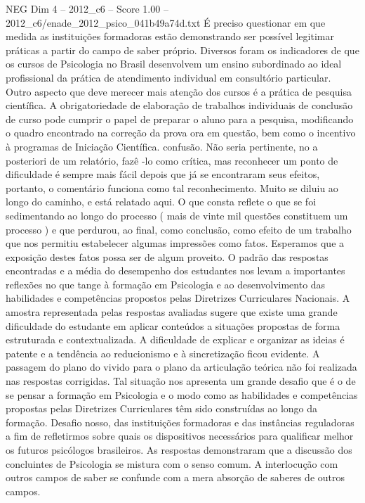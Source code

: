 \begin{textsample}{NEG Dim 4 – 2012\_c6 – Score 1.00 – 2012\_c6/enade\_2012\_psico\_041b49a74d.txt}
É preciso questionar em que medida as instituições formadoras estão demonstrando ser possível legitimar práticas a partir do campo de saber próprio.
Diversos foram os indicadores de que os cursos de Psicologia no Brasil desenvolvem um ensino subordinado ao ideal profissional da prática de atendimento individual em consultório particular.
Outro aspecto que deve merecer mais atenção dos cursos é a prática de pesquisa científica.
A obrigatoriedade de elaboração de trabalhos individuais de conclusão de curso pode cumprir o papel de preparar o aluno para a pesquisa, modificando o quadro encontrado na correção da prova ora em questão, bem como o incentivo à programas de Iniciação Científica. confusão.
Não seria pertinente, no a posteriori de um relatório, fazê -lo como crítica, mas reconhecer um ponto de dificuldade é sempre mais fácil depois que já se encontraram seus efeitos, portanto, o comentário funciona como tal reconhecimento.
Muito se diluiu ao longo do caminho, e está relatado aqui.
O que consta reflete o que se foi sedimentando ao longo do processo ( mais de vinte mil questões constituem um processo ) e que perdurou, ao final, como conclusão, como efeito de um trabalho que nos permitiu estabelecer algumas impressões como fatos.
Esperamos que a exposição destes fatos possa ser de algum proveito.
O padrão das respostas encontradas e a média do desempenho dos estudantes nos levam a importantes reflexões no que tange à formação em Psicologia e ao desenvolvimento das habilidades e competências propostos pelas Diretrizes Curriculares Nacionais.
A amostra representada pelas respostas avaliadas sugere que existe uma grande dificuldade do estudante em aplicar conteúdos a situações propostas de forma estruturada e contextualizada.
A dificuldade de explicar e organizar as ideias é patente e a tendência ao reducionismo e à sincretização ficou evidente.
A passagem do plano do vivido para o plano da articulação teórica não foi realizada nas respostas corrigidas.
Tal situação nos apresenta um grande desafio que é o de se pensar a formação em Psicologia e o modo como as habilidades e competências propostas pelas Diretrizes Curriculares têm sido construídas ao longo da formação.
Desafio nosso, das instituições formadoras e das instâncias reguladoras a fim de refletirmos sobre quais os dispositivos necessários para qualificar melhor os futuros psicólogos brasileiros.
As respostas demonstraram que a discussão dos concluintes de Psicologia se mistura com o senso comum.
A interlocução com outros campos de saber se confunde com a mera absorção de saberes de outros campos.

\end{textsample}
